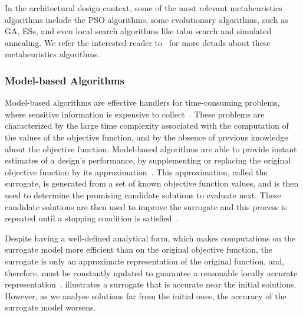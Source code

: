 	In the architectural design context, some of the most relevant metaheuristics algorithms include the \ac{PSO} algorithms, some evolutionary algorithms, such as \ac{GA}, \acp{ES}, and even local search algorithms like tabu search and simulated annealing. We refer the interested reader to~\cite{BlumRoli2003Metaheuristics,Glover2003Metaheuristics} for more details about these metaheuristics algorithms.
	
	\subsubsection{Model-based Algorithms}
	\label{ssec:model-based}
	Model-based algorithms are effective handlers for time-consuming problems, where sensitive information is expensive to collect~\cite{Forrester2009SBO, Wortmann2016BBO}. These problems are characterized by the large time complexity associated with the computation of the values of the objective function, and by the absence of previous knowledge about the objective function. Model-based algorithms are able to provide instant estimates of a design’s performance, by supplementing or replacing the original objective function by its approximation~\cite{Wortmann2016BBO}. This approximation, called the surrogate, is generated from a set of known objective function values, and is then used to determine the promising candidate solutions to evaluate next. These candidate solutions are then used to improve the surrogate and this process is repeated until a stopping condition is satisfied~\cite{Koziel2011}.
	
	Despite having a well-defined analytical form, which makes computations on the surrogate model more efficient than on the original objective function, the surrogate is only an approximate representation of the original function, and, therefore, must be constantly updated to guarantee a reasonable locally accurate representation~\cite{Koziel2011}.  illustrates a surrogate that is accurate near the initial solutions. However, as we analyse solutions far from the initial ones, the accuracy of the surrogate model worsens.
	
